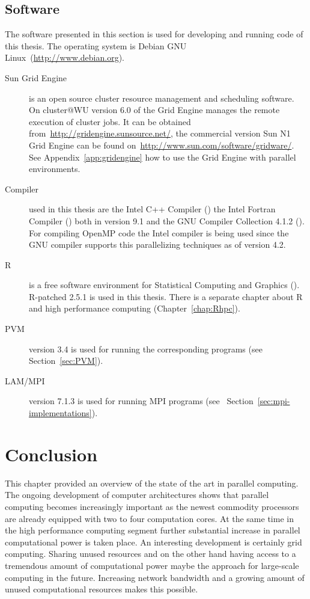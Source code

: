\subsection{Software}

The software presented in this section is used for developing and
running code of this thesis. The operating system is Debian GNU
Linux~(\url{http://www.debian.org}).
 
\begin{description}
\item[Sun Grid Engine] is an open source cluster resource management
  and scheduling software. On cluster@WU version 6.0 of the Grid
  Engine manages the remote execution of cluster jobs. It can be obtained
  from~\url{http://gridengine.sunsource.net/}, the commercial version
  Sun N1 Grid Engine can be found
  on~\url{http://www.sun.com/software/gridware/}. See
  Appendix~\ref{app:gridengine} how to use the Grid Engine with
  parallel environments.
\item[Compiler] used in this thesis are the Intel C++ Compiler
  (\cite{icc07}) the Intel Fortran Compiler (\cite{ifort07}) both in
  version 9.1 
  and the GNU Compiler Collection 4.1.2 (\cite{gcc07}). For compiling
  OpenMP code the 
  Intel compiler is being used since the GNU compiler supports this
  parallelizing techniques as of version 4.2.
\item[R] is a free software environment for Statistical Computing and
  Graphics (\cite{Rcore07R}). R-patched 2.5.1 is used in this
  thesis. There is a separate
  chapter about R and high performance computing (Chapter~\ref{chap:Rhpc}).
\item[PVM] version 3.4 is used for running the corresponding programs
  (see Section~\ref{sec:PVM}).
\item[LAM/MPI] version 7.1.3 is used for running MPI programs (see~
  Section~\ref{sec:mpi-implementations}). 
\end{description}

\section{Conclusion}

This chapter provided an overview of the state of the art in parallel
computing. The ongoing development of computer architectures shows that
parallel computing becomes increasingly important as the newest
commodity processors are already equipped with two to four computation
cores. At the same time in the high performance computing segment
further substantial increase in parallel computational power is taken
place. An interesting development is certainly grid computing. Sharing
unused resources and on the other hand having access to a tremendous
amount of computational power maybe the approach for large-scale
computing in the future. Increasing network bandwidth and a growing
amount of unused computational resources makes this possible.


